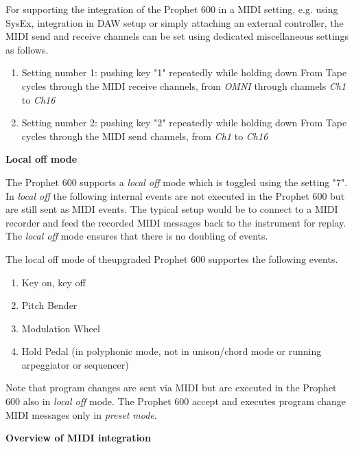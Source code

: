 For supporting the integration of the Prophet 600 in a MIDI setting, e.g. using SysEx, integration in DAW setup or simply attaching an external controller, the MIDI send and receive channels can be set using dedicated miscellaneous settings as follows.

\begin{enumerate}
  \setlength\itemsep{0cm}
  \item Setting number 1: pushing key "1" repeatedly while holding down From Tape cycles through the MIDI receive channels, from \textit{OMNI} through channels \textit{Ch1} to \textit{Ch16}
  \item Setting number 2: pushing key "2" repeatedly while holding down From Tape cycles through the MIDI send channels, from \textit{Ch1} to \textit{Ch16}
\end{enumerate}


\textbf{Local off mode}

The Prophet 600 supports a \textit{local off} mode which is toggled using the setting "7". In \textit{local off} the following internal events are not executed in the Prophet 600 but are still sent as MIDI events. The typical setup would be to connect to a MIDI recorder and feed the recorded MIDI messages back to the instrument for replay. The \textit{local off} mode ensures that there is no doubling of events.

The local off mode of theupgraded Prophet 600 supportes the following events.

\begin{enumerate}
  \setlength\itemsep{0cm}
  \item Key on, key off
  \item Pitch Bender
  \item Modulation Wheel
  \item Hold Pedal (in polyphonic mode, not in unison/chord mode or running arpeggiator or sequencer)
\end{enumerate}

Note that program changes are sent via MIDI but are executed in the Prophet 600 also in \textit{local off} mode. The Prophet 600 accept and executes program change MIDI messages only in \textit{preset mode}.  

\textbf{Overview of MIDI integration}



